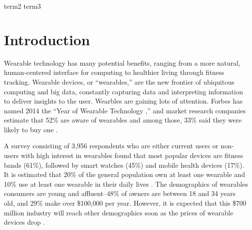 \documentclass{acm_proc_article-sp}
\begin{document}
 {term2} {term3}






\section{Introduction}
Wearable technology has many potential benefits, ranging from a more natural, human-centered interface for computing to healthier living through fitness tracking. Wearable devices, or ``wearables,'' are the new frontier of ubiquitous computing and big data, constantly capturing data and interpreting information to deliver insights to the user. Wearbles are gaining lots of attention. Forbes has named 2014 the ``Year of Wearable Technology \cite{Forbes},'' and market research companies estimate that 52\% are aware of wearables and among those, 33\% said they were likely to buy one \cite{NPD}. 

A survey consisting of 3,956 respondents who are either current users or non-users with high interest in wearables found that most popular devices are fitness bands (61\%), followed by smart watches (45\%) and mobile health devices (17\%)\cite{Nilsen}. It is estimated that 20\% of the general population own at least one wearable and 10\% use at least one wearable in their daily lives \cite{WearableStatNews}. The demographics of wearables consumers are young and affluent--48\% of owners are between 18 and 34 years old, and 29\% make over \$100,000 per year. However, it is expected that this \$700 million industry will reach other demographics soon as the prices of wearable devices drop \cite{cmo}. 
\end{document}
